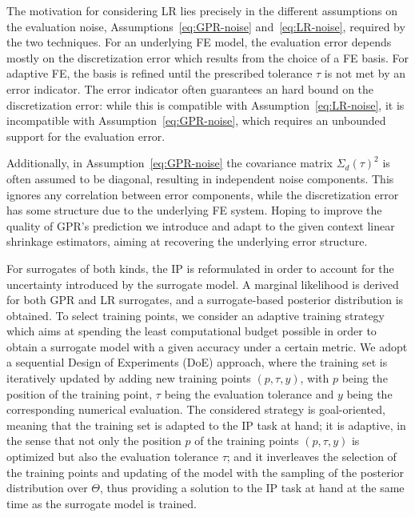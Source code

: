 The motivation for considering LR lies precisely in the different assumptions on the evaluation noise, Assumptions~\ref{eq:GPR-noise} and~\ref{eq:LR-noise}, required by the two techniques.
For an underlying FE model, the evaluation error depends mostly on the discretization error which results from the choice of a FE basis.
For adaptive FE, the basis is refined until the prescribed tolerance $\tau$ is not met by an error indicator.
The error indicator often guarantees an hard bound on the discretization error: while this is compatible with Assumption~\ref{eq:LR-noise}, it is incompatible with Assumption~\ref{eq:GPR-noise}, which requires an unbounded support for the evaluation error. 

Additionally, in Assumption~\ref{eq:GPR-noise} the covariance matrix $\Sigma_d(\tau)^2$ is often assumed to be diagonal, resulting in independent noise components. 
This ignores any correlation between error components, while the discretization error has some structure due to the underlying FE system.
Hoping to improve the quality of GPR's prediction we introduce and adapt to the given context linear shrinkage estimators, aiming at recovering the underlying error structure. \medskip

For surrogates of both kinds, the IP is reformulated in order to account for the uncertainty introduced by the surrogate model.
A marginal likelihood is derived for both GPR and LR surrogates, and a surrogate-based posterior distribution is obtained.
To select training points, we consider an adaptive training strategy which aims at spending the least computational budget possible in order to obtain a surrogate model with a given accuracy under a certain metric.
We adopt a sequential Design of Experiments (DoE) approach, where the training set is iteratively updated by adding new training points $(p,\tau,y)$, with $p$ being the position of the training point, $\tau$ being the evaluation tolerance and $y$ being the corresponding numerical evaluation.
The considered strategy is goal-oriented, meaning that the training set is adapted to the IP task at hand; it is adaptive, in the sense that not only the position $p$ of the training points $(p,\tau,y)$ is optimized but also the evaluation tolerance $\tau$; and it inverleaves the selection of the training points and updating of the model with the sampling of the posterior distribution over $\Theta$, thus providing a solution to the IP task at hand at the same time as the surrogate model is trained. \medskip

